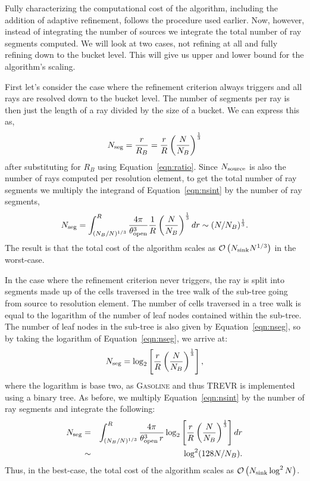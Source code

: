 \documentclass[fleq,usenatbib]{mnras}
\newcommand{\acro}{TREVR}
\newcommand{\bigO}[1]{\mathcal{O}\left(#1\right)}
\newcommand{\NS}{N_{\rm source}}
\newcommand{\NK}{N_{\rm sink}}
\newcommand{\tO}{\theta_{\rm open}}
\begin{document}
{Fully characterizing the computational cost of the algorithm, including the 
addition of adaptive refinement, follows the procedure used earlier. Now, 
however, instead of integrating the number of sources we integrate the total 
number of ray segments computed. We will look at two cases, not refining at 
all and fully refining down to the bucket level. This will give us upper and 
lower bound for the algorithm's scaling.

First let's consider the case where the refinement criterion always triggers 
and all rays are resolved down to the bucket level. The number of segments per 
ray is then just the length of a ray divided by the size of a bucket. We can 
express this as,
\begin{equation}
\label{eqn:nseg}
N_{\rm seg} = \frac{r}{R_B} = \frac{r}{R}\left(\frac{N}{N_B}\right)^\frac{1}{3}
\end{equation}
after substituting for $R_B$ using Equation~\ref{eqn:ratio}. Since $\NS$ is 
also the number of rays computed per resolution element, to get the total number of ray segments we
multiply the integrand of Equation~\ref{eqn:nsint} by the number of ray 
segments,
\begin{equation}
\label{eqn:nsegint}
N_{\rm seg} = \int_{(N_B/N)^{1/3}}^R 
\frac{4\pi}{\tO^3}
\frac{1}{R}\left(\frac{N}{N_B}\right)^\frac{1}{3} dr
\sim (N/N_B)^\frac{1}{3}.
\end{equation}
The result is that the total cost of the algorithm scales as
$\bigO{\NK N^{1/3}}$ in the worst-case.

In the case where the refinement criterion never triggers, the ray is split into 
segments made up of the cells traversed in the tree walk of the sub-tree going 
from source to resolution element. The number of cells traversed in a tree walk
is equal to the logarithm of the number of leaf nodes contained within the 
sub-tree. The number of leaf nodes in the sub-tree is also given by 
Equation~\ref{eqn:nseg}, so by taking the logarithm of 
Equation~\ref{eqn:nseg}, we arrive at:
\begin{equation}
\label{eqn:nseg2}
N_{\rm seg} = \log_2\left[\frac{r}{R}\left(
\frac{N}{N_B}\right)^\frac{1}{3}\right],
\end{equation}
where the logarithm is base two, as \textsc{Gasoline} and thus \acro{} is 
implemented using a binary tree. As before, we multiply 
Equation~\ref{eqn:nsint} by the number of ray segments and integrate the 
following:
\begin{eqnarray}
\label{eqn:nsegint2}
N_{\rm seg} & = & \int_{(N_B/N)^{1/3}}^R 
\frac{4\pi}{\tO^3\, r}
\log_2\left[\frac{r}{R}\left(
\frac{N}{N_B}\right)^\frac{1}{3}\right] dr \nonumber\\
& \sim & \log^2(128 N/N_B).
\end{eqnarray}
Thus, in the best-case, the total cost of the algorithm scales as  
$\bigO{\NK \log^2N}$.

}
\end{document}
